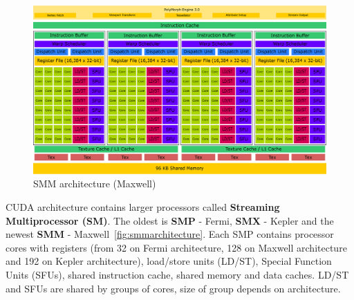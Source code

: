 \begin{figure}[h]
\centering
  \includegraphics[width=1\linewidth]{img/SMMArchitecture.eps}
  \caption{SMM architecture (Maxwell)}
  \label{fig:smmarchitecture}
\end{figure}

CUDA architecture contains larger processors called \textbf{Streaming Multiprocessor (SM)}. The oldest is \textbf{SMP} - Fermi, \textbf{SMX} - Kepler and the newest \textbf{SMM} - Maxwell~\autoref{fig:smmarchitecture}. Each SMP contains processor cores with registers (from 32 on Fermi architecture, 128 on Maxwell architecture and 192 on Kepler architecture), load/store units (LD/ST), Special Function Units (SFUs), shared instruction cache, shared memory and data caches. LD/ST and SFUs are shared by groups of cores, size of group depends on architecture.

